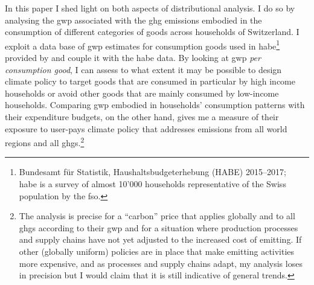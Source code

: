 \documentclass[referee, lineno, pdflatex,sn-apa]{sn-jnl}%
\theoremstyle{thmstyleone}%
\theoremstyle{thmstyletwo}%
\theoremstyle{thmstylethree}%
\begin{document}
In this paper I shed light on both aspects of distributional analysis.
I do so by analysing the \ac{gwp} associated with the \ac{ghg} emissions embodied in the consumption of different categories of goods across households of Switzerland.
I exploit a data base of \ac{gwp} estimates for consumption goods used in \ac{habe}\footnote{%
  Bundesamt für Statistik, Haushaltsbudgeterhebung (HABE) 2015--2017;\\
  \ac{habe} is a survey of almost 10'000 households representative of the Swiss population by the \ac{fso}.
}
provided by \citet{jakobs_nfp73_2023} and couple it with the \ac{habe} data.
By looking at \ac{gwp} \emph{per consumption good}, I can assess to what extent it may be possible to design climate policy to target goods that are consumed in particular by high income households or avoid other goods that are mainly consumed by low-income households.
Comparing \ac{gwp} embodied in households' consumption patterns with their expenditure budgets, on the other hand, gives me a measure of their exposure to user-pays climate policy that addresses emissions from all world regions and all \acp{ghg}.\footnote{%
  The analysis is precise for a ``carbon'' price that applies globally and to all \acp{ghg} according to their \ac{gwp} and for a situation where production processes and supply chains have not yet adjusted to the increased cost of emitting.
  If other (globally uniform) policies are in place that make emitting activities more expensive, and as processes and supply chains adapt, my analysis loses in precision but I would claim that it is still indicative of general trends.
}
\end{document}
